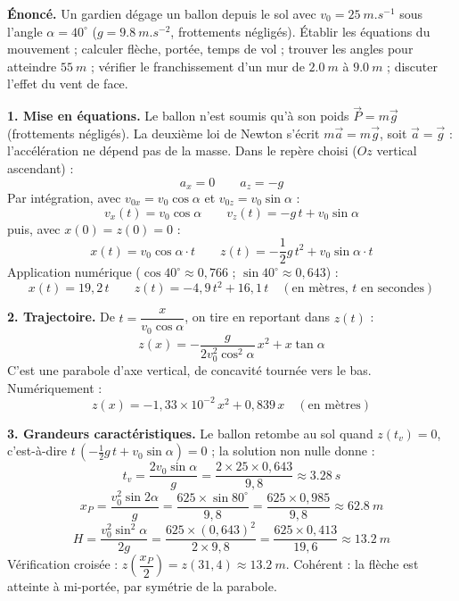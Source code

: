 \documentclass[11pt]{article}
\newcommand{\cle}[1]{{\popxbold\color{popdark}#1}}
\begin{document}
\begin{exoresolu}
\textbf{Énoncé.} Un gardien dégage un ballon depuis le sol avec $v_0 = \SI{25}{m.s^{-1}}$ sous l'angle $\alpha = 40^{\circ}$ ($g = \SI{9,8}{m.s^{-2}}$, frottements négligés). Établir les équations du mouvement ; calculer flèche, portée, temps de vol ; trouver les angles pour atteindre $\SI{55}{m}$ ; vérifier le franchissement d'un mur de $\SI{2,0}{m}$ à $\SI{9,0}{m}$ ; discuter l'effet du vent de face.

\tcblower

\textbf{1. Mise en équations.} Le ballon n'est soumis qu'à son poids $\vec{P} = m\vec{g}$ (frottements négligés). La deuxième loi de Newton s'écrit $m\vec{a} = m\vec{g}$, soit $\vec{a} = \vec{g}$ : l'accélération ne dépend pas de la masse. Dans le repère choisi ($Oz$ vertical ascendant) :
\[ a_x = 0 \qquad a_z = -g \]
Par intégration, avec $v_{0x} = v_0\cos\alpha$ et $v_{0z} = v_0\sin\alpha$ :
\[ v_x(t) = v_0\cos\alpha \qquad v_z(t) = -g\,t + v_0\sin\alpha \]
puis, avec $x(0) = z(0) = 0$ :
\[ x(t) = v_0\cos\alpha \cdot t \qquad z(t) = -\dfrac{1}{2}g\,t^2 + v_0\sin\alpha \cdot t \]
Application numérique ($\cos 40^{\circ} \approx 0{,}766$ ; $\sin 40^{\circ} \approx 0{,}643$) :
\[ x(t) = 19{,}2\,t \qquad z(t) = -4{,}9\,t^2 + 16{,}1\,t \quad (\text{en mètres, } t \text{ en secondes}) \]

\textbf{2. Trajectoire.} De $t = \dfrac{x}{v_0\cos\alpha}$, on tire en reportant dans $z(t)$ :
\[ z(x) = -\dfrac{g}{2v_0^2\cos^2\alpha}\,x^2 + x\tan\alpha \]
C'est une \cle{parabole} d'axe vertical, de concavité tournée vers le bas. Numériquement :
\[ z(x) = -1{,}33\times 10^{-2}\,x^2 + 0{,}839\,x \quad (\text{en mètres}) \]

\textbf{3. Grandeurs caractéristiques.} Le ballon retombe au sol quand $z(t_v) = 0$, c'est-à-dire $t\,\left(-\tfrac{1}{2}g\,t + v_0\sin\alpha\right) = 0$ ; la solution non nulle donne :
\[ t_v = \dfrac{2v_0\sin\alpha}{g} = \dfrac{2\times 25\times 0{,}643}{9{,}8} \approx \SI{3,28}{s} \]
\[ x_P = \dfrac{v_0^2\sin 2\alpha}{g} = \dfrac{625\times \sin 80^{\circ}}{9{,}8} = \dfrac{625\times 0{,}985}{9{,}8} \approx \SI{62,8}{m} \]
\[ H = \dfrac{v_0^2\sin^2\alpha}{2g} = \dfrac{625\times (0{,}643)^2}{2\times 9{,}8} = \dfrac{625\times 0{,}413}{19{,}6} \approx \SI{13,2}{m} \]
Vérification croisée : $z\!\left(\dfrac{x_P}{2}\right) = z(31{,}4) \approx \SI{13,2}{m}$. Cohérent : la flèche est atteinte à mi-portée, par symétrie de la parabole.


\end{exoresolu}
\end{document}

